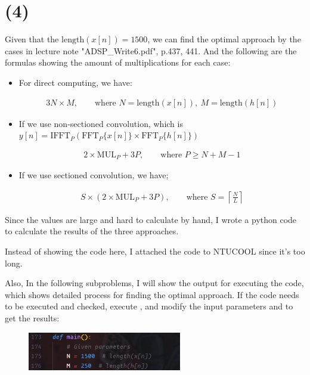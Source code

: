 \documentclass{article}
\begin{document}
\section*{(4)}

Given that the $\mathrm{length}(x[n]) = 1500$, 
we can find the optimal approach by the cases in lecture note "ADSP\_Write6.pdf", p.437, 441.
And the following are the formulas showing the amount of multiplications for each case:
\bigskip
\begin{itemize}
\item For direct computing, we have:

\begin{align*}
    3N \times M, \qquad \text{where } N = \mathrm{length}(x[n]), \ M = \mathrm{length}(h[n])
\end{align*}

\item If we use non-sectioned convolution, which is $y[n] = \mathrm{IFFT}_P( \mathrm{FFT}_P\{x[n]\} \times \mathrm{FFT}_P\{h[n]\} )$

\begin{align*}
    2 \times \mathrm{MUL}_{P} + 3 P, \qquad \text{where } P \geq N + M - 1
\end{align*}

\item If we use sectioned convolution, we have;

\begin{align*}
    S \times (2 \times \mathrm{MUL}_{P} + 3 P), \qquad \text{where } S = \left\lceil \frac{N}{L} \right\rceil
\end{align*}

\end{itemize}

Since the values are large and hard to calculate by hand, 
I wrote a python code to calculate the results of the three approaches.
\bigskip

Instead of showing the code here, 
I attached the code to NTUCOOL since it's too long.

Also, In the following subproblems, I will show the output for executing the code, 
which shows detailed process for finding the optimal approach.
If the code needs to be executed and checked, 
execute , 
and modify the input parameters  and  to get the results:

\begin{figure}[H]
    \centering
    \includegraphics[width=0.6\textwidth]{problem_4/code_input_setting.png}
\end{figure}
\end{document}
